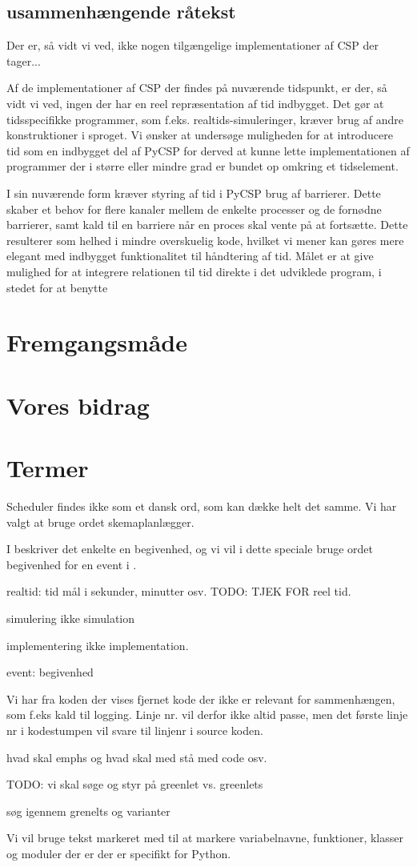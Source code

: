\subsection{usammenhængende råtekst}
Der er, så vidt vi ved, ikke nogen tilgængelige implementationer af CSP der 
tager... 

Af de implementationer af CSP der findes på nuværende tidspunkt, er der, så 
vidt vi ved, ingen der har en reel repræsentation af tid indbygget. Det gør at 
tidsspecifikke programmer, som f.eks. realtids-simuleringer, kræver brug af 
andre konstruktioner i sproget.
Vi ønsker at undersøge muligheden for at introducere tid som en indbygget del 
af PyCSP for derved at kunne lette implementationen af programmer der i større 
eller mindre grad er bundet op omkring et tidselement. 


I sin nuværende form kræver styring af tid i PyCSP brug af 
barrierer. Dette skaber et 
behov for flere kanaler mellem de enkelte processer og de fornødne barrierer, 
samt kald til en barriere når en proces skal vente på at fortsætte.  Dette 
resulterer som helhed i mindre overskuelig kode, hvilket vi mener kan gøres 
mere elegant med indbygget funktionalitet til håndtering af tid. Målet er at 
give mulighed for at integrere relationen til tid direkte i det udviklede 
program, i stedet for at benytte 

\section{Fremgangsmåde}
\section{Vores bidrag}
\section{Termer}

\begin{list}{}{}
\tightlist
\item Scheduler findes ikke som et dansk ord, som kan  dække helt det samme. Vi har valgt at bruge ordet skemaplanlægger.
\item I \des beskriver det enkelte  en begivenhed, og vi vil i dette speciale bruge ordet begivenhed for en event i \des. 
\item realtid: tid mål i sekunder, minutter osv. TODO: TJEK FOR reel tid.
\item simulering ikke simulation
\item implementering ikke implementation.
\item event: begivenhed
\item Vi har fra koden der vises fjernet kode der ikke er relevant for sammenhængen, som f.eks kald til logging. Linje nr. vil derfor ikke altid passe, men det første linje nr i kodestumpen vil svare til linjenr i source koden.
\item hvad skal emphs og hvad skal med stå med code osv.
\item TODO: vi skal søge og styr på  greenlet vs. greenlets
\item søg igennem grenelts og varianter
\end{list}


Vi vil bruge tekst markeret med  til at markere variabelnavne, funktioner,  klasser og moduler  der er  der er specifikt for Python.

